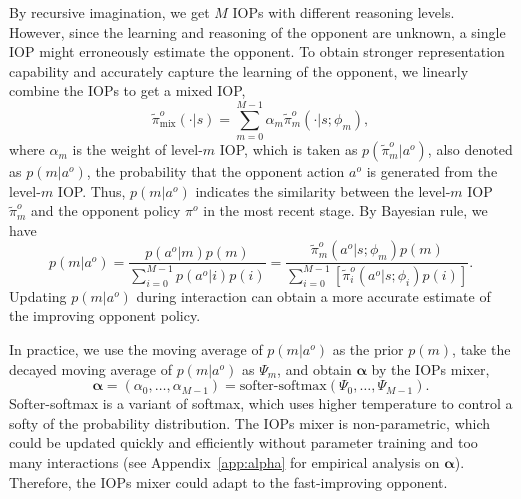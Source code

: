 \documentclass{article}
\begin{document}
By recursive imagination, we get $M$ IOPs with different reasoning levels. However, since the learning and reasoning of the opponent are unknown, a single IOP might erroneously estimate the opponent. To obtain stronger representation capability and accurately capture the learning of the opponent, we linearly combine the IOPs to get a mixed IOP,
\begin{equation}
\label{eq:phi_mix}
\tilde{\pi}^{o}_{\operatorname{mix}}(\cdot | s) = \sum_{m=0}^{M-1}\alpha_m\tilde{\pi}^o_m(\cdot|s; \phi_m),
\end{equation}
where $\alpha_m$ is the weight of level-$m$ IOP, which is taken as $p(\tilde{\pi}^o_m|a^o)$, also denoted as  $p(m|a^o)$, the probability that the opponent action $a^o$ is generated from the level-$m$ IOP. Thus, $p(m|a^o)$ indicates the similarity between the level-$m$ IOP $\tilde{\pi}^o_m$ and the opponent policy $\pi^o$ in the most recent stage. By Bayesian rule, we have
\begin{equation}
\label{eq:bayes}
    p(m|a^o) = \frac{p(a^o|m)p(m)}{\sum_{i=0}^{M-1}p(a^o|i)p(i)} = \frac{\tilde{\pi}^o_m(a^o|s;\phi_m)p(m)}{\sum_{i=0}^{M-1}\left[\tilde{\pi}^o_i(a^o|s;\phi_i)p(i)\right]}.
\end{equation}
Updating $p(m|a^o)$ during interaction can obtain a more accurate estimate of the improving opponent policy. 

In practice, we use the moving average of $p(m|a^o)$ as the prior $p(m)$, take the decayed moving average of $p(m|a^o)$ as $\Psi_m$, and obtain $\bm{\alpha}$ by the IOPs mixer,
\begin{equation}
\label{eq:mixture_weights}
    \bm{\alpha} = (\alpha_0, \dots, \alpha_{M-1}) = \text{softer-softmax}(\Psi_0, \dots, \Psi_{M-1}).
\end{equation}
Softer-softmax \citep{hinton2015distilling} is a variant of softmax, which uses higher temperature to control a softy of the probability distribution. The IOPs mixer is non-parametric, which could be updated quickly and efficiently without parameter training and too many interactions (see Appendix~\ref{app:alpha} for empirical analysis on $\bm{\alpha}$). Therefore, the IOPs mixer could adapt to the fast-improving opponent.
\end{document}

